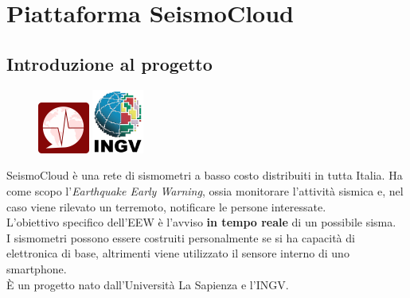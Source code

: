 \documentclass[a4paper,10pt]{memoir}
\begin{document}
\clearpage

\section{Piattaforma SeismoCloud}

\subsection{Introduzione al progetto}

\begin{figure}
\includegraphics[width=0.15\textwidth]{Chapter-1/seismocloud.png}
\includegraphics[width=0.15\textwidth]{Chapter-1/ingv.jpg}
\end{figure}

SeismoCloud è una rete di sismometri a basso costo distribuiti in tutta Italia. 
Ha come scopo l'\textit{Earthquake Early Warning}, ossia monitorare l'attività sismica e, nel caso viene rilevato un terremoto, notificare le persone interessate.
\\
L'obiettivo specifico dell'EEW è l'avviso \textbf{in tempo reale} di un possibile sisma.
\\
I sismometri possono essere costruiti personalmente se si ha capacità di elettronica di base, altrimenti viene utilizzato il sensore interno di uno smartphone.
\\
È un progetto nato dall'Università La Sapienza e l'INGV.
\end{document}

